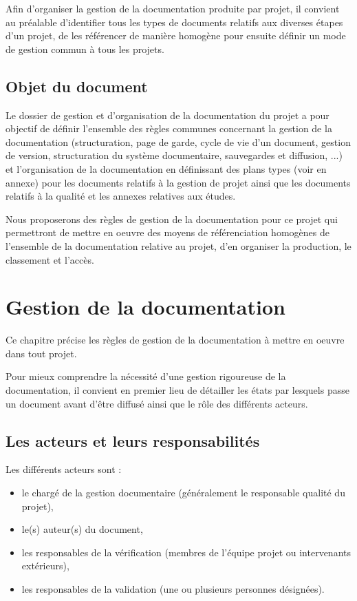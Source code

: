 \documentclass[a4paper]{article}
\begin{document}
Afin d’organiser la gestion de la documentation produite par projet, il convient au préalable d’identifier tous les types de documents relatifs aux diverses étapes d’un projet, de les référencer de manière homogène pour ensuite définir un mode de gestion commun à tous les projets.

\subsection{Objet du document}

Le dossier de gestion et d'organisation de la documentation du projet a pour objectif de définir l’ensemble des règles
communes concernant la gestion de la documentation (structuration, page de garde, cycle de vie d’un
document, gestion de version, structuration du système documentaire, sauvegardes et diffusion, ...) et
l’organisation de la documentation en définissant des plans types (voir en annexe) pour les documents relatifs à la gestion de
projet ainsi que les documents relatifs à la qualité et les annexes relatives aux études.

Nous proposerons des règles de gestion de la documentation pour ce projet qui permettront de mettre en oeuvre des moyens
de référenciation homogènes de l'ensemble de la documentation relative au projet, d'en organiser la production, le classement
et l'accès.

\section{Gestion de la documentation}

Ce chapitre précise les règles de gestion de la documentation à mettre en oeuvre dans tout projet.

Pour mieux comprendre la nécessité d’une gestion rigoureuse de la documentation, il convient en premier lieu de détailler les états par lesquels passe un document avant d’être diffusé ainsi que le rôle des différents acteurs.

\subsection{Les acteurs et leurs responsabilités}

Les différents acteurs sont :

\begin{itemize}
\item le chargé de la gestion documentaire (généralement le responsable qualité du projet),
\item le(s) auteur(s) du document,
\item les responsables de la vérification (membres de l’équipe projet ou intervenants extérieurs),
\item les responsables de la validation (une ou plusieurs personnes désignées).
\end{itemize}
\end{document}

